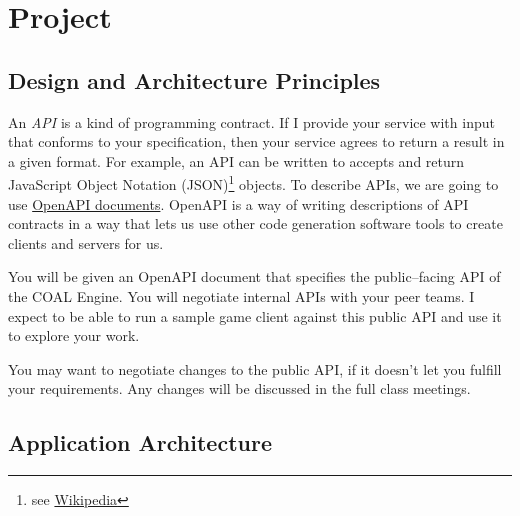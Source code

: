 \documentclass{article}
\newcommand{\enterProblemHeader}[1]{
}
\newcommand{\exitProblemHeader}[1]{
\nobreak\extramarks{#1}{}\nobreak
}
\newcounter{homeworkProblemCounter} %
\newcommand{\homeworkProblemName}{}
\newenvironment{homeworkProblem}[1][Problem \arabic{homeworkProblemCounter}]{ %
\stepcounter{homeworkProblemCounter} %
\renewcommand{\homeworkProblemName}{#1} %
\section{\homeworkProblemName} %
\enterProblemHeader{\homeworkProblemName} %
}{
\exitProblemHeader{\homeworkProblemName} %
}
\newcommand{\homeworkSectionName}{}
\newenvironment{homeworkSection}[1]{ %
\renewcommand{\homeworkSectionName}{#1} %
\subsection{\homeworkSectionName} %
\enterProblemHeader{\homeworkProblemName\ [\homeworkSectionName]} %
}{
\enterProblemHeader{\homeworkProblemName} %
}
\begin{document}
\begin{homeworkProblem}[Project]
\begin{homeworkSection}{Design and Architecture Principles}
	An \textit{API} is a kind of programming contract. If I provide your service with input that conforms to your specification, then your service agrees to return a result in a given format. For example, an API can be written to accepts and return JavaScript Object Notation (JSON)\footnote{see \href{https://en.wikipedia.org/wiki/JSON}{Wikipedia}} objects. To describe APIs, we are going to use \href{https://swagger.io/specification/}{OpenAPI documents}. OpenAPI is a way of writing descriptions of API contracts in a way that lets us use other code generation software tools to create clients and servers for us.

  You will be given an OpenAPI document that specifies the public--facing API of the COAL Engine. You will negotiate internal APIs with your peer teams. I expect to be able to run a sample game client against this public API and use it to explore your work.
	
	You may want to negotiate changes to the public API, if it doesn't let you fulfill your requirements. Any changes will be discussed in the full class meetings.
\end{homeworkSection}

\begin{homeworkSection}{Application Architecture}
	
\begin{figure}
\centering
{}
\end{figure}
\end{homeworkSection}
\end{homeworkProblem}
\end{document}
